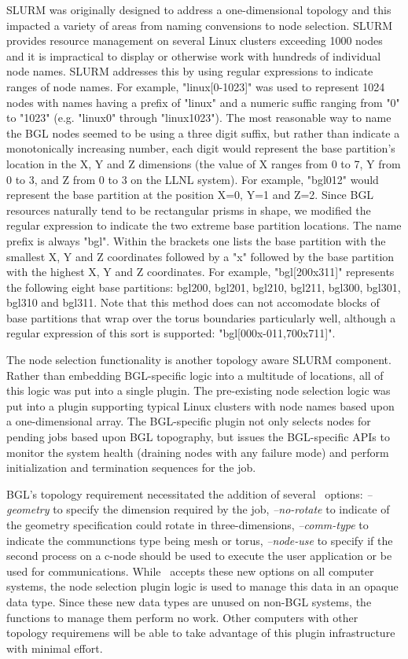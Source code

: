 \documentclass[10pt,onecolumn,times]{../common/llncs}
\begin{document}
{SLURM was originally designed to address a one-dimensional topology
and this impacted a variety of areas from naming convensions to 
node selection. 
SLURM provides resource management on several Linux clusters 
exceeding 1000 nodes and it is impractical to display or otherwise 
work with hundreds of individual node names. 
SLURM addresses this by using regular expressions to indicate 
ranges of node names. 
For example, "linux[0-1023]" was used to represent 1024 nodes 
with names having a prefix of "linux" and a numeric suffic ranging 
from "0" to "1023" (e.g. "linux0" through "linux1023"). 
The most reasonable way to name the BGL nodes seemed to be 
using a three digit suffix, but rather than indicate a monotonically 
increasing number, each digit would represent the base partition's 
location in the X, Y and Z dimensions (the value of X ranges 
from 0 to 7, Y from 0 to 3, and Z from 0 to 3 on the LLNL system).
For example, "bgl012" would represent the base partition at
the position X=0, Y=1 and Z=2.
Since BGL resources naturally tend to be rectangular prisms in 
shape, we modified the regular expression to indicate the two 
extreme base partition locations. 
The name prefix is always "bgl". 
Within the brackets one lists the base partition with the smallest
X, Y and Z coordinates followed by a "x" followed by the base 
partition with the highest X, Y and Z coordinates.
For example, "bgl[200x311]" represents the following eight base 
partitions: bgl200, bgl201, bgl210, bgl211, bgl300, bgl301, bgl310
and bgl311.
Note that this method does can not accomodate blocks of base 
partitions that wrap over the torus boundaries particularly well, 
although a regular expression of this sort is supported: 
"bgl[000x-011,700x711]".

The node selection functionality is another topology aware 
SLURM component. 
Rather than embedding BGL-specific logic into a multitude of 
locations, all of this logic was put into a single plugin. 
The pre-existing node selection logic was put into a plugin 
supporting typical Linux clusters with node names based 
upon a one-dimensional array. 
The BGL-specific plugin not only selects nodes for pending jobs 
based upon BGL topography, but issues the BGL-specific APIs 
to monitor the system health (draining nodes with any failure 
mode) and perform initialization and termination sequences for the job.

BGL's topology requirement necessitated the addition of several 
\srun\ options: {\em --geometry} to specify the dimension required by 
the job,
 {\em --no-rotate} to indicate of the geometry specification could rotate 
in three-dimensions,
{\em --comm-type} to indicate the communctions type being mesh or torus,
{\em --node-use} to specify if the second process on a c-node should 
be used to execute the user application or be used for communications. 
While \srun\ accepts these new options on all computer systems, 
the node selection plugin logic is used to manage this data in an 
opaque data type. 
Since these new data types are unused on non-BGL systems, the 
functions to manage them perform no work. 
Other computers with other topology requiremens will be able to 
take advantage of this plugin infrastructure with minimal effort.

}
\end{document}

